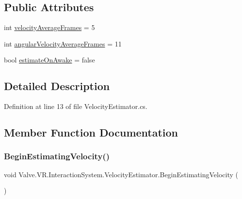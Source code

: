 \subsection*{Public Attributes}
\begin{DoxyCompactItemize}
\item 
int \mbox{\hyperlink{class_valve_1_1_v_r_1_1_interaction_system_1_1_velocity_estimator_a838dbedcb8be448e4c2224296b3b2622}{velocity\+Average\+Frames}} = 5
\item 
int \mbox{\hyperlink{class_valve_1_1_v_r_1_1_interaction_system_1_1_velocity_estimator_a7682e772901dd4d49493ec4073de3aff}{angular\+Velocity\+Average\+Frames}} = 11
\item 
bool \mbox{\hyperlink{class_valve_1_1_v_r_1_1_interaction_system_1_1_velocity_estimator_a6f41731474b7149756386f9daef4ab1a}{estimate\+On\+Awake}} = false
\end{DoxyCompactItemize}


\subsection{Detailed Description}


Definition at line 13 of file Velocity\+Estimator.\+cs.



\subsection{Member Function Documentation}
\mbox{\label{class_valve_1_1_v_r_1_1_interaction_system_1_1_velocity_estimator_a7e6e08f723805cc2837f9e90aa8d583d}} 
\subsubsection{\texorpdfstring{BeginEstimatingVelocity()}{BeginEstimatingVelocity()}}
{\footnotesize\ttfamily void Valve.\+V\+R.\+Interaction\+System.\+Velocity\+Estimator.\+Begin\+Estimating\+Velocity (\begin{DoxyParamCaption}{ }\end{DoxyParamCaption})}



